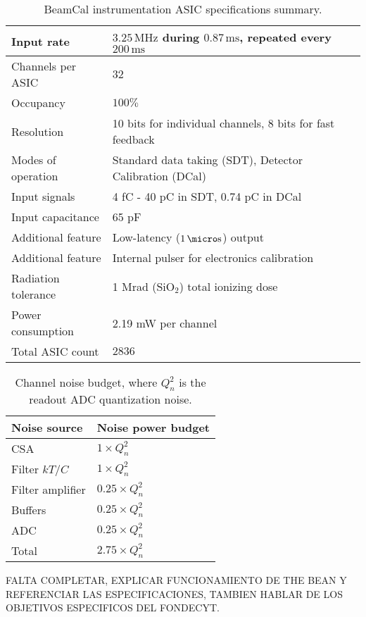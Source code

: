 \begin{table}[!t]
	\begin{center}
		\begin{tabular}{|l|l|}\hline
			Input rate & $3.25\,\text{MHz}$ during $0.87\,\text{ms}$, repeated every $200\,\text{ms}$ \\ \hline
			Channels per ASIC & $32$ \\ \hline
			Occupancy & $100\%$ \\ \hline
			Resolution & 10 bits for individual channels, 8 bits for fast feedback \\ \hline
			Modes of operation & Standard data taking (SDT), Detector Calibration (DCal) \\ \hline
			Input signals & 4 fC - 40 pC in SDT, 0.74 pC in DCal \\ \hline
			Input capacitance & 65 pF \\ \hline
			Additional feature & Low-latency ($1\,\micro\text{s}$) output \\ \hline
			Additional feature & Internal pulser for electronics calibration \\ \hline
			Radiation tolerance & 1 Mrad ($\text{SiO}_2$) total ionizing dose \\ \hline
			Power consumption & 2.19 mW per channel \\ \hline
			Total ASIC count & $2836$ \\\hline
		\end{tabular}
		\vspace*{5pt}
		\caption{BeamCal instrumentation ASIC specifications summary.}\label{tab:bean_specs}
	\end{center}
\end{table}

\begin{table}[!t]
	\begin{center}
		\begin{tabular}{|l|l|}\hline
			{\bf Noise source} & {\bf Noise power budget} \\ \hline\hline
			CSA & $1\times Q_n^2$ \\ \hline
			Filter $kT/C$ & $1\times Q_n^2$ \\ \hline
			Filter amplifier & $0.25\times Q_n^2$ \\\hline 
			Buffers & $0.25\times Q_n^2$ \\ \hline
			ADC & $0.25\times Q_n^2$ \\ \hline
			Total & $2.75\times Q_n^2$ \\\hline
		\end{tabular}
		\vspace*{5pt}
		\caption{Channel noise budget, where $Q_n^2$ is the readout ADC quantization noise.}\label{tab:noise_budget}
	\end{center}
\end{table}

FALTA COMPLETAR, EXPLICAR FUNCIONAMIENTO DE THE BEAN Y REFERENCIAR LAS ESPECIFICACIONES, TAMBIEN HABLAR DE LOS OBJETIVOS ESPECIFICOS DEL FONDECYT.